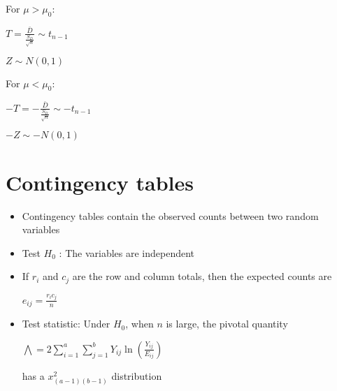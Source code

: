 \documentclass[12pt]{report}
\begin{document}
    For $\mu > \mu_0$:
    \begin{center}$ T = \frac{\bar{D}}{\frac{S_D}{\sqrt{n}}} \sim t_{n-1} $\end{center}
    \begin{center}$ Z \sim N(0, 1) $\end{center}

    For $\mu < \mu_0$:
    \begin{center}$ -T = -\frac{\bar{D}}{\frac{S_D}{\sqrt{n}}} \sim -t_{n-1} $\end{center}
    \begin{center}$ -Z \sim -N(0, 1) $\end{center}


  \section{Contingency tables}
    \begin{itemize}
      \item Contingency tables contain the observed counts between two random variables
      \item Test $H_0$ : The variables are independent
      \item If $r_i$ and $c_j$ are the row and column totals, then the expected counts are
        \begin{center}$e_{ij} = \frac{r_ic_j}{n}$\end{center}
      \item Test statistic: Under $H_0$, when $n$ is large, the pivotal quantity
        \begin{center}$\bigwedge = 2 \sum_{i=1}^a \sum_{j=1}^{b} Y_{ij} \ln{(\frac{Y_{ij}}{E_{ij}})}$\end{center}
          has a $x^2_{(a-1)(b-1)}$ distribution
    \end{itemize}
\end{document}
